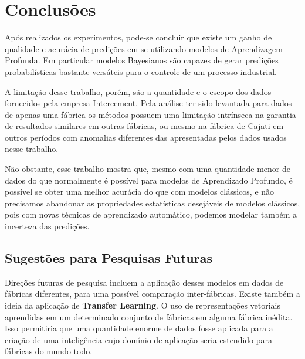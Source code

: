 \chapter{Conclusões}
\label{cap:conclusoes}


Após realizados os experimentos, pode-se concluir que existe um ganho de
qualidade e acurácia de predições em se utilizando modelos de Aprendizagem
Profunda. Em particular modelos Bayesianos são capazes de gerar predições
probabilísticas bastante versáteis para o controle de um processo industrial.

A limitação desse trabalho, porém, são a quantidade e o escopo dos dados
fornecidos pela empresa Intercement. Pela análise ter sido levantada para dados
de apenas uma fábrica os métodos possuem uma limitação intrínseca na garantia de
resultados similares em outras fábricas, ou mesmo na fábrica de Cajati em
outros períodos com anomalias diferentes das apresentadas pelos dados usados
nesse trabalho.

Não obstante, esse trabalho mostra que, mesmo com uma quantidade menor de dados
do que normalmente é possível para modelos de Aprendizado Profundo, é possível
se obter uma melhor acurácia do que com modelos clássicos, e não precisamos
abandonar as propriedades estatísticas desejáveis de modelos clássicos, pois com
novas técnicas de aprendizado automático, podemos modelar também a incerteza das predições.


\section{Sugestões para Pesquisas Futuras} 

Direções futuras de pesquisa incluem a aplicação desses modelos em dados
de fábricas diferentes, para uma possível comparação inter-fábricas. Existe
também a ideia da aplicação de \textbf{Transfer Learning}. O uso de
representações vetoriais aprendidas em um determinado conjunto de fábricas em
alguma fábrica inédita. Isso permitiria que uma quantidade enorme de dados fosse
aplicada para a criação de uma inteligência cujo domínio de aplicação seria
estendido para fábricas do mundo todo.



